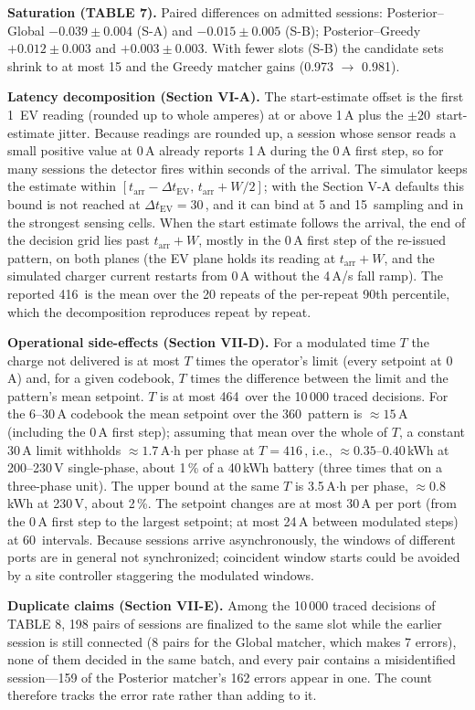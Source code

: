 \documentclass[10pt]{article}
\newcommand{\sq}{\,\text{s}}
\begin{document}
\textbf{Saturation (TABLE 7).} Paired differences on admitted sessions: Posterior--Global $-0.039 \pm 0.004$ (S-A) and $-0.015 \pm 0.005$ (S-B); Posterior--Greedy $+0.012 \pm 0.003$ and $+0.003 \pm 0.003$. With fewer slots (S-B) the candidate sets shrink to at most 15 and the Greedy matcher gains (0.973 $\rightarrow$ 0.981).

\textbf{Latency decomposition (Section VI-A).} The start-estimate offset is the first 1\sq{} EV reading (rounded up to whole amperes) at or above 1\,A plus the $\pm 20$\sq{} start-estimate jitter. Because readings are rounded up, a session whose sensor reads a small positive value at 0\,A already reports 1\,A during the 0\,A first step, so for many sessions the detector fires within seconds of the arrival. The simulator keeps the estimate within $[t_{\text{arr}} - \Delta t_{\text{EV}},\, t_{\text{arr}} + W/2]$; with the Section V-A defaults this bound is not reached at $\Delta t_{\text{EV}} = 30$\sq{}, and it can bind at 5 and 15\sq{} sampling and in the strongest sensing cells. When the start estimate follows the arrival, the end of the decision grid lies past $t_{\text{arr}} + W$, mostly in the 0\,A first step of the re-issued pattern, on both planes (the EV plane holds its reading at $t_{\text{arr}} + W$, and the simulated charger current restarts from 0\,A without the 4\,A/s fall ramp). The reported 416\sq{} is the mean over the 20 repeats of the per-repeat 90th percentile, which the decomposition reproduces repeat by repeat.

\textbf{Operational side-effects (Section VII-D).} For a modulated time $T$ the charge not delivered is at most $T$ times the operator's limit (every setpoint at 0\,A) and, for a given codebook, $T$ times the difference between the limit and the pattern's mean setpoint. $T$ is at most 464\sq{} over the 10\,000 traced decisions. For the 6--30\,A codebook the mean setpoint over the 360\sq{} pattern is $\approx 15$\,A (including the 0\,A first step); assuming that mean over the whole of $T$, a constant 30\,A limit withholds $\approx 1.7$\,A$\cdot$h per phase at $T = 416$\sq, i.e., $\approx 0.35$--$0.40$\,kWh at 200--230\,V single-phase, about 1\,\% of a 40\,kWh battery (three times that on a three-phase unit). The upper bound at the same $T$ is 3.5\,A$\cdot$h per phase, $\approx 0.8$\,kWh at 230\,V, about 2\,\%. The setpoint changes are at most 30\,A per port (from the 0\,A first step to the largest setpoint; at most 24\,A between modulated steps) at 60\sq{} intervals. Because sessions arrive asynchronously, the windows of different ports are in general not synchronized; coincident window starts could be avoided by a site controller staggering the modulated windows.

\textbf{Duplicate claims (Section VII-E).} Among the 10\,000 traced decisions of TABLE 8, 198 pairs of sessions are finalized to the same slot while the earlier session is still connected (8 pairs for the Global matcher, which makes 7 errors), none of them decided in the same batch, and every pair contains a misidentified session---159 of the Posterior matcher's 162 errors appear in one. The count therefore tracks the error rate rather than adding to it.
\end{document}
